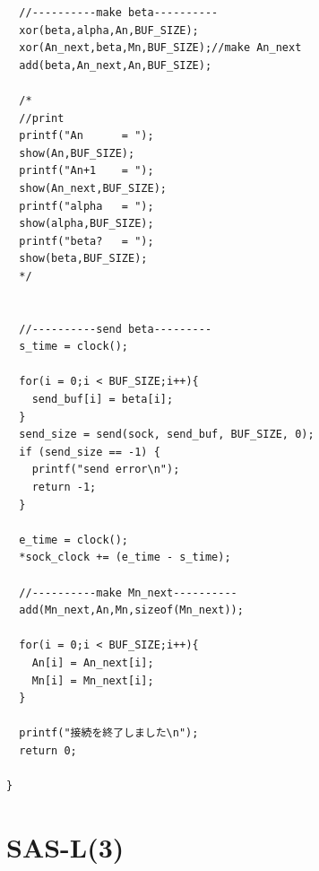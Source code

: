 \documentclass{thesis}
\begin{document}
\begin{verbatim}
  //----------make beta---------- 
  xor(beta,alpha,An,BUF_SIZE);
  xor(An_next,beta,Mn,BUF_SIZE);//make An_next
  add(beta,An_next,An,BUF_SIZE);

  /*
  //print
  printf("An      = ");
  show(An,BUF_SIZE);
  printf("An+1    = ");
  show(An_next,BUF_SIZE);
  printf("alpha   = ");
  show(alpha,BUF_SIZE);
  printf("beta?   = ");
  show(beta,BUF_SIZE);
  */


  //----------send beta---------
  s_time = clock();
  
  for(i = 0;i < BUF_SIZE;i++){
    send_buf[i] = beta[i];
  }
  send_size = send(sock, send_buf, BUF_SIZE, 0);
  if (send_size == -1) {
    printf("send error\n");
    return -1;
  }

  e_time = clock();
  *sock_clock += (e_time - s_time);
  
  //----------make Mn_next----------
  add(Mn_next,An,Mn,sizeof(Mn_next));

  for(i = 0;i < BUF_SIZE;i++){
    An[i] = An_next[i];
    Mn[i] = Mn_next[i];
  }

  printf("接続を終了しました\n");
  return 0;
 
}

\end{verbatim}

\section{SAS-L(3)}
\end{document}
